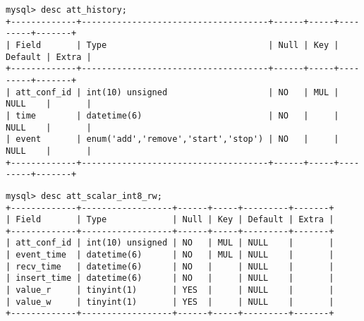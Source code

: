 \documentclass[11pt,a4paper]{article}
\begin{document}
{\footnotesize
	\begin{Verbatim}
mysql> desc att_history;
+-------------+-------------------------------------+------+-----+---------+-------+
| Field       | Type                                | Null | Key | Default | Extra |
+-------------+-------------------------------------+------+-----+---------+-------+
| att_conf_id | int(10) unsigned                    | NO   | MUL | NULL    |       |
| time        | datetime(6)                         | NO   |     | NULL    |       |
| event       | enum('add','remove','start','stop') | NO   |     | NULL    |       |
+-------------+-------------------------------------+------+-----+---------+-------+
	\end{Verbatim}
}
{\footnotesize
	\begin{Verbatim}
mysql> desc att_scalar_int8_rw;
+-------------+------------------+------+-----+---------+-------+
| Field       | Type             | Null | Key | Default | Extra |
+-------------+------------------+------+-----+---------+-------+
| att_conf_id | int(10) unsigned | NO   | MUL | NULL    |       |
| event_time  | datetime(6)      | NO   | MUL | NULL    |       |
| recv_time   | datetime(6)      | NO   |     | NULL    |       |
| insert_time | datetime(6)      | NO   |     | NULL    |       |
| value_r     | tinyint(1)       | YES  |     | NULL    |       |
| value_w     | tinyint(1)       | YES  |     | NULL    |       |
+-------------+------------------+------+-----+---------+-------+
\end{Verbatim}
}
\end{document}
